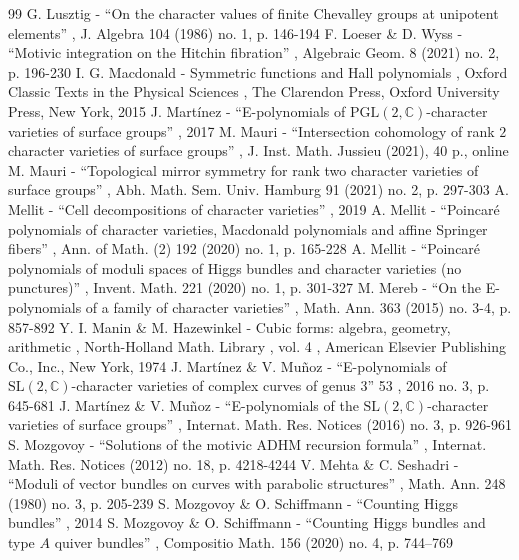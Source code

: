 \documentclass[11pt]{article}
\theoremstyle{definition}
\theoremstyle{plain}
\begin{document}
\begin{thebibliography}{99}
 G. Lusztig - “On the character values of finite Chevalley groups at unipotent elements” , J. Algebra 104 (1986) no. 1, p. 146-194
 F. Loeser \& D. Wyss - “Motivic integration on the Hitchin fibration” , Algebraic Geom. 8 (2021) no. 2, p. 196-230
 I. G. Macdonald - Symmetric functions and Hall polynomials , Oxford Classic Texts in the Physical Sciences , The Clarendon Press, Oxford University Press, New York, 2015
 J. Martínez - “E-polynomials of $\mathrm{PGL}(2,\mathbb{C})$-character varieties of surface groups” , 2017
 M. Mauri - “Intersection cohomology of rank $2$ character varieties of surface groups” , J. Inst. Math. Jussieu (2021), 40 p., online
 M. Mauri - “Topological mirror symmetry for rank two character varieties of surface groups” , Abh. Math. Sem. Univ. Hamburg 91 (2021) no. 2, p. 297-303
 A. Mellit - “Cell decompositions of character varieties” , 2019
 A. Mellit - “Poincaré polynomials of character varieties, Macdonald polynomials and affine Springer fibers” , Ann. of Math. (2) 192 (2020) no. 1, p. 165-228
 A. Mellit - “Poincaré polynomials of moduli spaces of Higgs bundles and character varieties (no punctures)” , Invent. Math. 221 (2020) no. 1, p. 301-327
 M. Mereb - “On the E-polynomials of a family of character varieties” , Math. Ann. 363 (2015) no. 3-4, p. 857-892
 Y. I. Manin \& M. Hazewinkel - Cubic forms: algebra, geometry, arithmetic , North-Holland Math. Library , vol. 4 , American Elsevier Publishing Co., Inc., New York, 1974
 J. Martínez \& V. Muñoz - “E-polynomials of $\mathrm{SL}(2,\mathbb{C})$-character varieties of complex curves of genus 3” 53 , 2016 no. 3, p. 645-681
 J. Martínez \& V. Muñoz - “E-polynomials of the $\mathrm{SL}(2,\mathbb{C})$-character varieties of surface groups” , Internat. Math. Res. Notices (2016) no. 3, p. 926-961
 S. Mozgovoy - “Solutions of the motivic ADHM recursion formula” , Internat. Math. Res. Notices (2012) no. 18, p. 4218-4244
 V. Mehta \& C. Seshadri - “Moduli of vector bundles on curves with parabolic structures” , Math. Ann. 248 (1980) no. 3, p. 205-239
 S. Mozgovoy \& O. Schiffmann - “Counting Higgs bundles” , 2014
 S. Mozgovoy \& O. Schiffmann - “Counting Higgs bundles and type ${A}$ quiver bundles” , Compositio Math. 156 (2020) no. 4, p. 744–769

\end{thebibliography}
\end{document}
